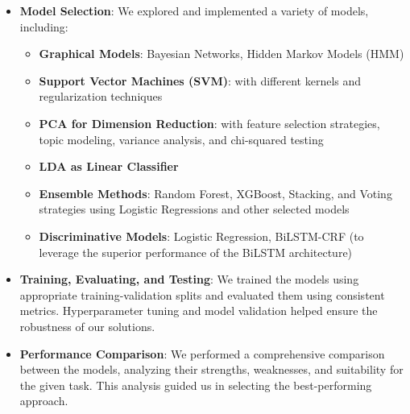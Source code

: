 \begin{itemize}
    \item \textbf{Model Selection}: 
    We explored and implemented a variety of models, including:
    \begin{itemize}
        \item \textbf{Graphical Models}: Bayesian Networks, Hidden Markov Models (HMM)
        \item \textbf{Support Vector Machines (SVM)}: with different kernels and regularization techniques
        \item \textbf{PCA for Dimension Reduction}: with feature selection strategies, topic modeling, variance analysis, and chi-squared testing
        \item \textbf{LDA as Linear Classifier}
        \item \textbf{Ensemble Methods}: Random Forest, XGBoost, Stacking, and Voting strategies using Logistic Regressions and other selected models
        \item \textbf{Discriminative Models}: Logistic Regression, BiLSTM-CRF (to leverage the superior performance of the BiLSTM architecture)
    \end{itemize}

    \item \textbf{Training, Evaluating, and Testing}: 
    We trained the models using appropriate training-validation splits and evaluated them using consistent metrics. Hyperparameter tuning and model validation helped ensure the robustness of our solutions.

    \item \textbf{Performance Comparison}: 
    We performed a comprehensive comparison between the models, analyzing their strengths, weaknesses, and suitability for the given task. This analysis guided us in selecting the best-performing approach.
\end{itemize}
